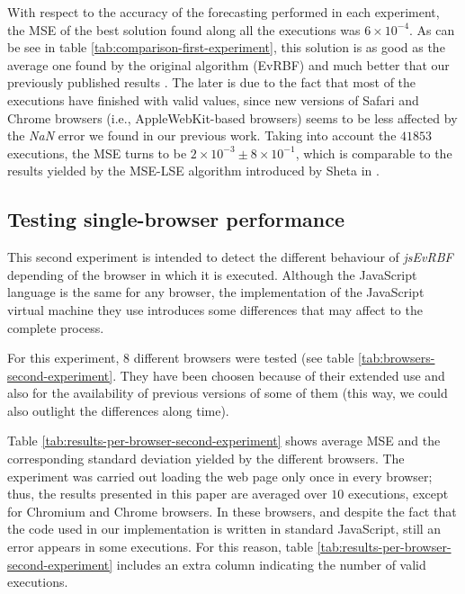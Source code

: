 \documentclass{article}
\begin{document}
With respect to the accuracy of the forecasting performed in each
experiment, the MSE of the best
solution found along all the executions was $6\times10^{-4}$. As can
be see in table \ref{tab:comparison-first-experiment}, this solution
is as good as the average one found by the original algorithm (EvRBF)
and much better that our previously published results \cite{DBLP:conf/dcai/RivasPMAG16}. The later is due to the fact that most of the executions have
finished with valid values, since new versions of Safari and Chrome
browsers (i.e., AppleWebKit-based browsers) seems to be less affected by the
{\em NaN} error we found in our previous work. Taking into account the
$41853$ executions, the MSE turns to be $2 \times
10^{-3}\pm8\times10^{-1}$, which is comparable to the results yielded
by the MSE-LSE algorithm introduced by Sheta in \cite{Sheta2001}.






\subsection{Testing single-browser performance}
\label{sec:second-experiment}

This second experiment is intended to detect the different behaviour of {\em jsEvRBF} depending of the browser in which it is executed. Although the JavaScript language is the same for any browser, the implementation of the
JavaScript virtual machine they use introduces some differences that may affect to the complete process.

For this experiment, $8$ different browsers were tested (see table \ref{tab:browsers-second-experiment}. They have been choosen because of their extended use and also for the availability of previous versions of some of them (this way, we could also outlight the differences along time).


Table \ref{tab:results-per-browser-second-experiment} shows average MSE and the corresponding standard deviation yielded by the different browsers. The experiment was carried out loading the web page only once in every browser; thus, the results presented in this paper are averaged over $10$ executions, except for Chromium and Chrome browsers. In these browsers, and despite the fact that the code used in our implementation is written in standard JavaScript, still an error appears in some executions. For this reason, table \ref{tab:results-per-browser-second-experiment} includes an extra column indicating the number of valid executions.
\end{document}
